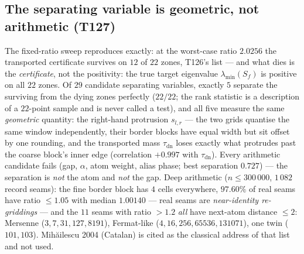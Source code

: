 \documentclass[11pt,a4paper]{article}
\begin{document}
\subsection{The separating variable is geometric, not arithmetic (T127)}
The fixed-ratio sweep reproduces exactly: at the worst-case ratio $2.0256$ the transported
certificate survives on $12$ of $22$ zones, T126's list --- and what dies is the
\emph{certificate}, not the positivity: the true target eigenvalue $\lambda_{\min}(S_f)$ is
positive on all $22$ zones. Of $29$ candidate separating variables, exactly $5$ separate the
surviving from the dying zones perfectly ($22/22$; the rank statistic is a description of a
$22$-point sample and is never called a test), and all five measure the same \emph{geometric}
quantity: the right-hand protrusion $s_{l,r}$ --- the two grids quantise the same window
independently, their border blocks have equal width but sit offset by one rounding, and the
transported mass $\tau_{\mathrm{dn}}$ loses exactly what protrudes past the coarse block's inner
edge (correlation $+0.997$ with $\tau_{\mathrm{dn}}$). Every arithmetic candidate fails (gap,
$\alpha$, atom weight, alias phase; best separation $0.727$) --- the separation is \emph{not} the
atom and \emph{not} the gap. Deep arithmetic ($n\le300\,000$, $1\,082$ record seams): the fine
border block has $4$ cells everywhere, $97.60\%$ of real seams have ratio $\le1.05$ with median
$1.00140$ --- real seams are \emph{near-identity re-griddings} --- and the $11$ seams with ratio
$>1.2$ \emph{all} have next-atom distance $\le2$: Mersenne ($3,7,31,127,8191$), Fermat-like
($4,16,256,65536,131071$), one twin ($101,103$). Mih\u{a}ilescu 2004 (Catalan) is cited as the
classical address of that list and not used.
\end{document}
